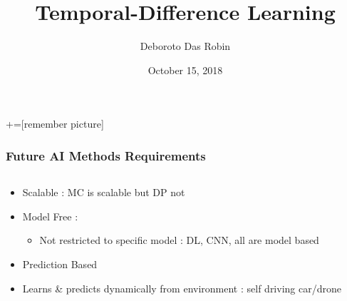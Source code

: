 \documentclass{beamer} %
\author{Deboroto Das Robin}
\title{Temporal-Difference Learning}
\date{October 15, 2018}
\institute{Kent State University}
\begin{document}
\maketitle

+=[remember picture]

\everymath{\displaystyle}
\begin{frame}
\frametitle{Future AI Methods Requirements}


\begin{columns}
    \begin{column}{1\textwidth}
     \begin{block}{}
			\begin{itemize}
				\item Scalable : MC is scalable but DP not
				\item Model Free : 		
					\begin{itemize}
						\item Not restricted to specific model : DL, CNN, all are model based
						
					\end{itemize}
				\item Prediction Based
				\item Learns \& predicts dynamically from environment : self driving car/drone
			\end{itemize}

    \end{block}
    \end{column}
    \begin{column}{.5\textwidth}
    \begin{block}{}
    \end{block}
    \end{column}
  \end{columns}

\end{frame}
\end{document}
